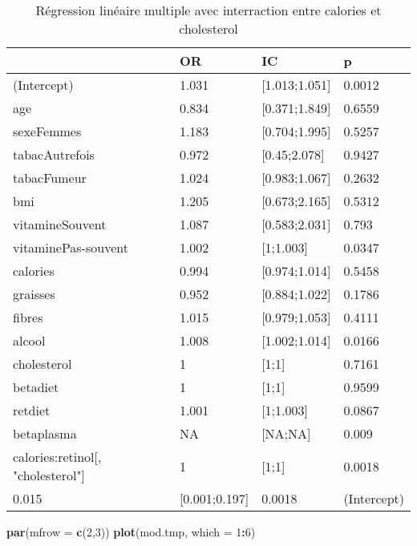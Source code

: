 \documentclass[]{article}
\newenvironment{Shaded}{\begin{snugshade}}{\end{snugshade}}
\newcommand{\KeywordTok}[1]{\textcolor[rgb]{0.13,0.29,0.53}{\textbf{#1}}}
\newcommand{\DataTypeTok}[1]{\textcolor[rgb]{0.13,0.29,0.53}{#1}}
\newcommand{\DecValTok}[1]{\textcolor[rgb]{0.00,0.00,0.81}{#1}}
\newcommand{\OperatorTok}[1]{\textcolor[rgb]{0.81,0.36,0.00}{\textbf{#1}}}
\newcommand{\NormalTok}[1]{#1}
\begin{document}
\begin{table}

\caption{\label{tab:unnamed-chunk-88}Régression linéaire multiple avec interraction entre calories et cholesterol}
\centering
\begin{tabular}[t]{l|l|l|l}
\hline
  & OR & IC & p\\
\hline
\rowcolor[HTML]{BBD2E1}  (Intercept) & 1.031 & [1.013;1.051] & 0.0012\\
\hline
age & 0.834 & [0.371;1.849] & 0.6559\\
\hline
\rowcolor[HTML]{BBD2E1}  sexeFemmes & 1.183 & [0.704;1.995] & 0.5257\\
\hline
tabacAutrefois & 0.972 & [0.45;2.078] & 0.9427\\
\hline
\rowcolor[HTML]{BBD2E1}  tabacFumeur & 1.024 & [0.983;1.067] & 0.2632\\
\hline
bmi & 1.205 & [0.673;2.165] & 0.5312\\
\hline
\rowcolor[HTML]{BBD2E1}  vitamineSouvent & 1.087 & [0.583;2.031] & 0.793\\
\hline
vitaminePas-souvent & 1.002 & [1;1.003] & 0.0347\\
\hline
\rowcolor[HTML]{BBD2E1}  calories & 0.994 & [0.974;1.014] & 0.5458\\
\hline
graisses & 0.952 & [0.884;1.022] & 0.1786\\
\hline
\rowcolor[HTML]{BBD2E1}  fibres & 1.015 & [0.979;1.053] & 0.4111\\
\hline
alcool & 1.008 & [1.002;1.014] & 0.0166\\
\hline
\rowcolor[HTML]{BBD2E1}  cholesterol & 1 & [1;1] & 0.7161\\
\hline
betadiet & 1 & [1;1] & 0.9599\\
\hline
\rowcolor[HTML]{BBD2E1}  retdiet & 1.001 & [1;1.003] & 0.0867\\
\hline
betaplasma & NA & [NA;NA] & 0.009\\
\hline
\rowcolor[HTML]{BBD2E1}  calories:retinol[, "cholesterol"] & 1 & [1;1] & 0.0018\\
\hline
0.015 & [0.001;0.197] & 0.0018 & (Intercept)\\
\hline
\end{tabular}
\end{table}

\begin{Shaded}
\begin{Highlighting}[]
\KeywordTok{par}\NormalTok{(}\DataTypeTok{mfrow =} \KeywordTok{c}\NormalTok{(}\DecValTok{2}\NormalTok{,}\DecValTok{3}\NormalTok{))}
\KeywordTok{plot}\NormalTok{(mod.tmp, }\DataTypeTok{which =} \DecValTok{1}\OperatorTok{:}\DecValTok{6}\NormalTok{)}
\end{Highlighting}
\end{Shaded}
\end{document}
